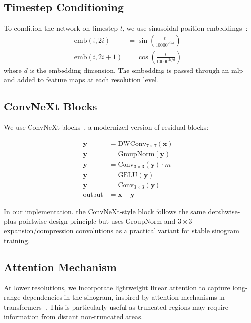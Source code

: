 \subsection{Timestep Conditioning}

To condition the network on timestep $t$, we use sinusoidal position embeddings~\cite{vaswani2017attention}:
%
\begin{align}
\text{emb}(t, 2i) &= \sin\left(\frac{t}{10000^{2i/d}}\right) \\
\text{emb}(t, 2i+1) &= \cos\left(\frac{t}{10000^{2i/d}}\right)
\end{align}
%
where $d$ is the embedding dimension. The embedding is passed through an \gls{mlp} and added to feature maps at each resolution level.

\subsection{ConvNeXt Blocks}

We use ConvNeXt blocks~\cite{liu2022convnet}, a modernized version of residual blocks:

\begin{equation}
\begin{split}
\mathbf{y} &= \text{DWConv}_{7\times7}(\mathbf{x}) \\
\mathbf{y} &= \text{GroupNorm}(\mathbf{y}) \\
\mathbf{y} &= \text{Conv}_{3\times3}(\mathbf{y}) \cdot m \\
\mathbf{y} &= \text{GELU}(\mathbf{y}) \\
\mathbf{y} &= \text{Conv}_{3\times3}(\mathbf{y}) \\
\text{output} &= \mathbf{x} + \mathbf{y}
\end{split}
\end{equation}

In our implementation, the ConvNeXt-style block follows the same depthwise-plus-pointwise design principle but uses GroupNorm and $3\times3$ expansion/compression convolutions as a practical variant for stable sinogram training.

\subsection{Attention Mechanism}

At lower resolutions, we incorporate lightweight linear attention to capture long-range dependencies in the sinogram, inspired by attention mechanisms in transformers~\cite{vaswani2017attention}. This is particularly useful as truncated regions may require information from distant non-truncated areas.

